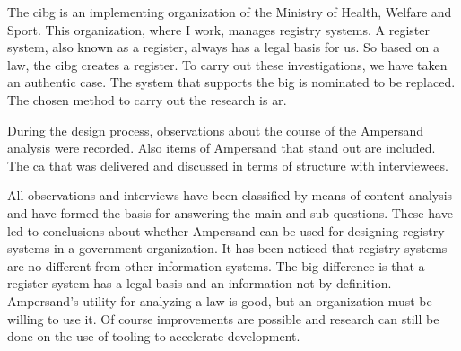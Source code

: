 The \acrshort{cibg} is an implementing organization of the Ministry of Health, Welfare and Sport.
This organization, where I work, manages registry systems.
A register system, also known as a register, always has a legal basis for us.
So based on a law, the \acrshort{cibg} creates a register.
To carry out these investigations, we have taken an authentic case.
The system that supports the \acrshort{big} is nominated to be replaced.
The chosen method to carry out the research is \acrshort{ar}.

During the design process, observations about the course of the Ampersand analysis were recorded.
Also items of Ampersand that stand out are included.
The \acrlong{ca} that was delivered and discussed in terms of structure with interviewees.

All observations and interviews have been classified by means of content analysis and have formed the basis for answering the main and sub questions.
These have led to conclusions about whether Ampersand can be used for designing registry systems in a government organization.
It has been noticed that registry systems are no different from other information systems.
The big difference is that a register system has a legal basis and an information not by definition.
Ampersand's utility for analyzing a law is good, but an organization must be willing to use it.
Of course improvements are possible and research can still be done on the use of tooling to accelerate development.